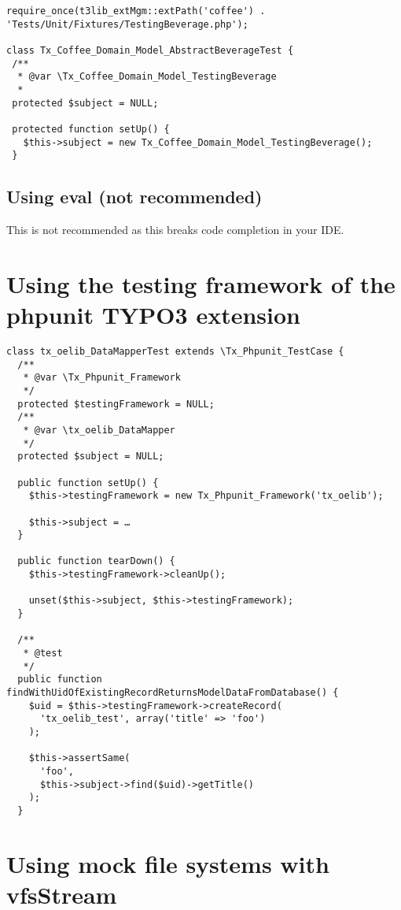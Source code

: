\documentclass[a4paper,twoside,landscape]{scrartcl}
\begin{document}
\small
\begin{verbatim}
require_once(t3lib_extMgm::extPath('coffee') . 'Tests/Unit/Fixtures/TestingBeverage.php');

class Tx_Coffee_Domain_Model_AbstractBeverageTest {
 /**
  * @var \Tx_Coffee_Domain_Model_TestingBeverage
  *
 protected $subject = NULL;

 protected function setUp() {
   $this->subject = new Tx_Coffee_Domain_Model_TestingBeverage();
 }
\end{verbatim}
\normalsize

\subsection{Using eval (not recommended)}
This is not recommended as this breaks code completion in your IDE.


\newpage

\section{Using the testing framework of the phpunit TYPO3 extension}

\small
\begin{verbatim}
class tx_oelib_DataMapperTest extends \Tx_Phpunit_TestCase {
  /**
   * @var \Tx_Phpunit_Framework
   */
  protected $testingFramework = NULL;
  /**
   * @var \tx_oelib_DataMapper
   */
  protected $subject = NULL;

  public function setUp() {
    $this->testingFramework = new Tx_Phpunit_Framework('tx_oelib');

    $this->subject = …
  }

  public function tearDown() {
    $this->testingFramework->cleanUp();

    unset($this->subject, $this->testingFramework);
  }

  /**
   * @test
   */
  public function findWithUidOfExistingRecordReturnsModelDataFromDatabase() {
    $uid = $this->testingFramework->createRecord(
      'tx_oelib_test', array('title' => 'foo')
    );

    $this->assertSame(
      'foo',
      $this->subject->find($uid)->getTitle()
    );
  }
\end{verbatim}
\normalsize

\section{Using mock file systems with vfsStream}
\end{document}
